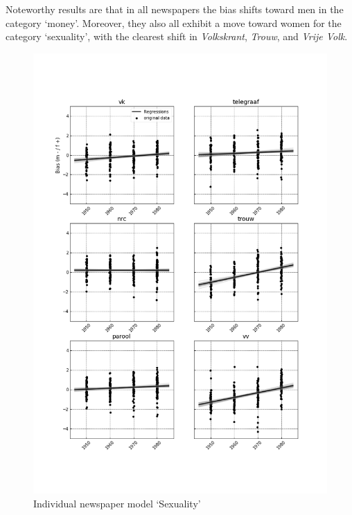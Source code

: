 \documentclass[11pt,a4paper]{article}
\begin{document}
Noteworthy results are that in all newspapers the bias shifts toward men in the category `money'. Moreover, they also all exhibit a move toward women for the category `sexuality', with the clearest shift in \textit{Volkskrant}, \textit{Trouw}, and \textit{Vrije Volk}. 
\begin{figure}
  \includegraphics[width=\linewidth]{figures/indiv_Sexual}
  \vspace*{-15mm}
  \caption{Individual newspaper model `Sexuality'}
  \label{fig:indiv_sexuality}
\end{figure}
\end{document}
